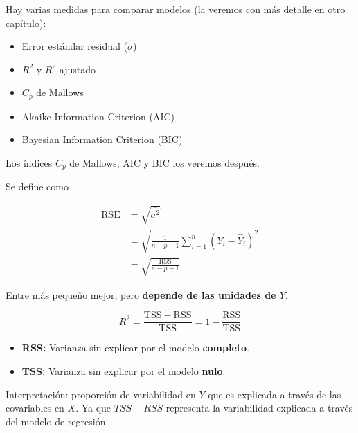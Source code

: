 \documentclass[
  12pt,
]{book}
\providecommand{\tightlist}{%
  \setlength{\itemsep}{0pt}\setlength{\parskip}{0pt}}
\theoremstyle{definition}
\theoremstyle{definition}
\theoremstyle{definition}
\theoremstyle{definition}
\theoremstyle{remark}
\begin{document}
Hay varias medidas para comparar modelos (la veremos con más detalle en otro capítulo):

\begin{itemize}
\tightlist
\item
  Error estándar residual (\(\sigma\))
\item
  \(R^{2}\) y \(R^{2}\) ajustado
\item
  \(C_{p}\) de Mallows
\item
  Akaike Information Criterion (AIC)
\item
  Bayesian Information Criterion (BIC)
\end{itemize}

Los índices \(C_{p}\) de Mallows, AIC y BIC los veremos después.

\begin{description}
\tightlist
\item[Error estándar residual]
Se define como
\end{description}

\begin{align*}
\mathrm{RSE} 
&=  \sqrt{\hat{\sigma^{2}}}\\
&= \sqrt{\frac{1}{n-p-1} \sum_{i=1}^{n} \left( Y_{i} - \hat{Y}_{i}\right)^{2}} \\
&= \sqrt{\frac{\mathrm{RSS}}{n-p-1}}
\end{align*}

Entre más pequeño mejor, pero \textbf{depende de las unidades de \(Y\)}.

\begin{description}
\tightlist
\item[Estadístico \(R^{2}\)]
\begin{equation*}
R^{2} = \frac{\mathrm{TSS}-\mathrm{RSS}}{\mathrm{TSS}} = 1-\frac{\mathrm{RSS}}{\mathrm{TSS}}
\end{equation*}
\end{description}

\begin{itemize}
\tightlist
\item
  \textbf{RSS:} Varianza sin explicar por el modelo \textbf{completo}.
\item
  \textbf{TSS:} Varianza sin explicar por el modelo \textbf{nulo}.
\end{itemize}

Interpretación: proporción de variabilidad en \(Y\) que es explicada a través de las covariables en \(X\). Ya que \(TSS-RSS\) representa la variabilidad explicada a través del modelo de regresión.
\end{document}
